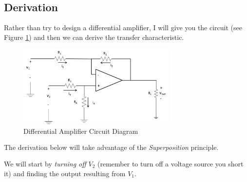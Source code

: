 \documentclass{handout}
\begin{document}
\subsection{Derivation}
Rather than try to design a differential amplifier, I will give you the circuit (see Figure \ref{fig: DifferentialAmplifierCircuit}) and then we can derive the transfer characteristic.

\begin{figure} [h!]
\centering
\includegraphics[width=0.7\textwidth]{DifferentialAmplifierCircuit.jpg}
\caption{Differential Amplifier  Circuit Diagram}
\label{fig: DifferentialAmplifierCircuit}
\end{figure}

The derivation below will take advantage of the {\em Superposition} principle.

\newpage
\clearpage
\pagebreak

We will start by {\em turning off} $V_2$ (remember to turn off a voltage source you short it) and finding the output resulting from $V_1$.
\end{document}
